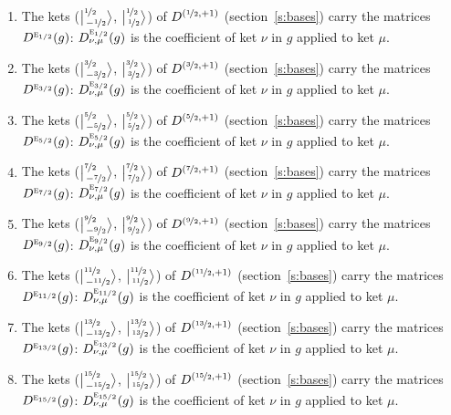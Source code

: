 \documentclass[10pt,a4paper]{article}
\numberwithin{equation}{section}
\newcommand{\irr}[1]{\text{\normalfont\scshape #1}}
\newcommand{\irrJp}[2]{D^{(#1,#2)}}
\newcommand{\repD}[1]{D^{#1}}
\newcommand{\intx}{\mu}
\newcommand{\jm}[2]{\bigl\lvert{}^{#1}_{\,#2}\bigr\rangle}
\newenvironment{romanlist}{\begin{enumerate}%
\renewcommand{\labelenumi}{(\roman{enumi})}}%
  {\end{enumerate}}
\begin{document}
\begin{romanlist}\raggedright
\item The kets ($\jm{\nicefrac{1}{2}}{-\nicefrac{1}{2}}$, $\jm{\nicefrac{1}{2}}{\nicefrac{1}{2}}$) of $\irrJp{\nicefrac{1}{2}}{+1}$ (section~\ref{s:bases}) carry the matrices $\repD{\irr{e}_{1/2}}(g)$: $\repD{\irr{e}_{1/2}}_{\nu,\intx}(g)$ is the coefficient of ket $\nu$ in $g$ applied to ket $\intx$.
\item The kets ($\jm{\nicefrac{3}{2}}{-\nicefrac{3}{2}}$, $\jm{\nicefrac{3}{2}}{\nicefrac{3}{2}}$) of $\irrJp{\nicefrac{3}{2}}{+1}$ (section~\ref{s:bases}) carry the matrices $\repD{\irr{e}_{3/2}}(g)$: $\repD{\irr{e}_{3/2}}_{\nu,\intx}(g)$ is the coefficient of ket $\nu$ in $g$ applied to ket $\intx$.
\item The kets ($\jm{\nicefrac{5}{2}}{-\nicefrac{5}{2}}$, $\jm{\nicefrac{5}{2}}{\nicefrac{5}{2}}$) of $\irrJp{\nicefrac{5}{2}}{+1}$ (section~\ref{s:bases}) carry the matrices $\repD{\irr{e}_{5/2}}(g)$: $\repD{\irr{e}_{5/2}}_{\nu,\intx}(g)$ is the coefficient of ket $\nu$ in $g$ applied to ket $\intx$.
\item The kets ($\jm{\nicefrac{7}{2}}{-\nicefrac{7}{2}}$, $\jm{\nicefrac{7}{2}}{\nicefrac{7}{2}}$) of $\irrJp{\nicefrac{7}{2}}{+1}$ (section~\ref{s:bases}) carry the matrices $\repD{\irr{e}_{7/2}}(g)$: $\repD{\irr{e}_{7/2}}_{\nu,\intx}(g)$ is the coefficient of ket $\nu$ in $g$ applied to ket $\intx$.
\item The kets ($\jm{\nicefrac{9}{2}}{-\nicefrac{9}{2}}$, $\jm{\nicefrac{9}{2}}{\nicefrac{9}{2}}$) of $\irrJp{\nicefrac{9}{2}}{+1}$ (section~\ref{s:bases}) carry the matrices $\repD{\irr{e}_{9/2}}(g)$: $\repD{\irr{e}_{9/2}}_{\nu,\intx}(g)$ is the coefficient of ket $\nu$ in $g$ applied to ket $\intx$.
\item The kets ($\jm{\nicefrac{11}{2}}{-\nicefrac{11}{2}}$, $\jm{\nicefrac{11}{2}}{\nicefrac{11}{2}}$) of $\irrJp{\nicefrac{11}{2}}{+1}$ (section~\ref{s:bases}) carry the matrices $\repD{\irr{e}_{11/2}}(g)$: $\repD{\irr{e}_{11/2}}_{\nu,\intx}(g)$ is the coefficient of ket $\nu$ in $g$ applied to ket $\intx$.
\item The kets ($\jm{\nicefrac{13}{2}}{-\nicefrac{13}{2}}$, $\jm{\nicefrac{13}{2}}{\nicefrac{13}{2}}$) of $\irrJp{\nicefrac{13}{2}}{+1}$ (section~\ref{s:bases}) carry the matrices $\repD{\irr{e}_{13/2}}(g)$: $\repD{\irr{e}_{13/2}}_{\nu,\intx}(g)$ is the coefficient of ket $\nu$ in $g$ applied to ket $\intx$.
\item The kets ($\jm{\nicefrac{15}{2}}{-\nicefrac{15}{2}}$, $\jm{\nicefrac{15}{2}}{\nicefrac{15}{2}}$) of $\irrJp{\nicefrac{15}{2}}{+1}$ (section~\ref{s:bases}) carry the matrices $\repD{\irr{e}_{15/2}}(g)$: $\repD{\irr{e}_{15/2}}_{\nu,\intx}(g)$ is the coefficient of ket $\nu$ in $g$ applied to ket $\intx$.
\end{romanlist}
\end{document}
